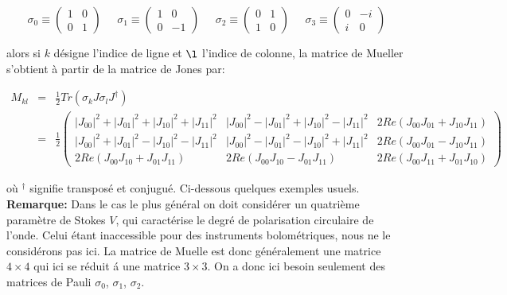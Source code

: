 \documentclass[a4paper,10pt]{article}
\begin{document}
\begin{equation}
\sigma_0 \equiv \left(\begin{array}{cc}
1 & 0\\
0 & 1\end{array}\right)\;\;\;\;\;
\sigma_1 \equiv \left(\begin{array}{cc}
1 & 0\\
0 & -1\end{array}\right)\;\;\;\;\;
\sigma_2 \equiv \left(\begin{array}{cc}
0 & 1\\
1 & 0\end{array}\right)\;\;\;\;\;
\sigma_3 \equiv \left(\begin{array}{cc}
0 & -i\\
i & 0\end{array}\right)
\end{equation}

alors si $k$ d\'esigne l'indice de ligne et $\l$ l'indice de colonne,
la matrice de Mueller s'obtient \`a partir de la matrice de Jones par:

\begin{eqnarray}
M_{kl} & = & \frac{1}{2}Tr\left(\sigma_k J \sigma_l J^\dag\right) \label{eq:jones2mueller_1}\\
&=& \frac{1}{2}\left(\begin{array}{rrr}
|J_{00}|^2 + |J_{01}|^2 + |J_{10}|^2 + |J_{11}|^2 &
|J_{00}|^2 - |J_{01}|^2 + |J_{10}|^2 - |J_{11}|^2 &
2Re(J_{00}J_{01} + J_{10}J_{11}) \\

|J_{00}|^2 + |J_{01}|^2 - |J_{10}|^2 - |J_{11}|^2 &
|J_{00}|^2 - |J_{01}|^2 - |J_{10}|^2 + |J_{11}|^2 &
2Re(J_{00}J_{01} - J_{10}J_{11}) \\

2Re( J_{00}J_{10} + J_{01}J_{11}) &
2Re( J_{00}J_{10} - J_{01}J_{11}) &
2Re( J_{00}J_{11} + J_{01}J_{10})\end{array}\right) \label{eq:jones2mueller_2}
\end{eqnarray}

o\`u $^\dag$ signifie transpos\'e et conjugu\'e. Ci-dessous quelques
exemples usuels.\\

{\bf Remarque:} Dans le cas le plus g\'en\'eral on doit consid\'erer
un quatri\`eme param\`etre de Stokes $V$, qui caract\'erise le degr\'e
de polarisation circulaire de l'onde. Celui \'etant inaccessible pour
des instruments bolom\'etriques, nous ne le consid\'erons pas ici. La
matrice de Muelle est donc g\'en\'eralement une matrice $4\times4$ qui
ici se r\'eduit \'a une matrice $3\times3$. On a donc ici besoin
seulement des matrices de Pauli $\sigma_0$, $\sigma_1$, $\sigma_2$.
\end{document}
